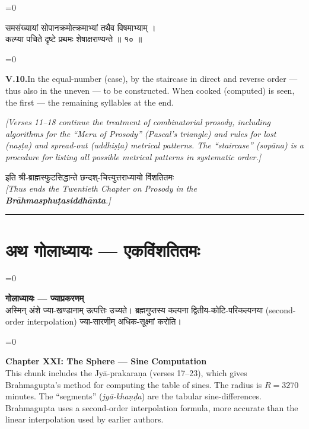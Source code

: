 \documentclass[11pt,a4paper]{article}
\newcommand{\longline}{\noindent\rule{\textwidth}{0.4pt}}
\newcommand{\cnote}[1]{\textcolor{notecolor}{\textit{#1}}}
\newcommand{\dev}[1]{{\devanagarifont\color{sktcolor}#1}}
\newcommand{\dsec}[1]{\section*{\dev{#1}}}
\newcommand{\iast}[1]{\textit{#1}}
\newenvironment{paracol}[1]{\begingroup}{\endgroup}
\newcommand{\switchcolumn}[1][]{%
  \ifnum#1=0\relax\else\par\nobreak\vspace{0.5em}\par\nobreak\fi%
}
\begin{document}
\vspace{0.3cm}

\begin{paracol}{2}
\switchcolumn[0]
\dev{%
समसंख्यायां सोपानक्रमोत्क्रमाभ्यां तथैव विषमाभ्याम् ।\\
कल्प्या पचिते दृष्टे प्रथमः शेषाक्षराण्यन्ते ॥ १० ॥
}

\switchcolumn[1]
\textbf{V.10.}\quad In the equal-number (case), by the staircase
in direct and reverse order — thus also in the uneven — to be
constructed. When cooked (computed) is seen, the first — the
remaining syllables at the end.
\end{paracol}

\vspace{0.5cm}
\cnote{[Verses 11–18 continue the treatment of combinatorial prosody,
including algorithms for the ``Meru of Prosody'' (Pascal's triangle)
and rules for lost (\iast{naṣṭa}) and spread-out (\iast{uddhiṣṭa})
metrical patterns. The ``staircase'' (\iast{sopāna}) is a procedure
for listing all possible metrical patterns in systematic order.]}

\vspace{0.5cm}

\begin{center}
\dev{इति श्री-ब्राह्मस्फुटसिद्धान्ते छन्दश्-चित्त्युत्तराध्यायो विंशतितमः}\\[0.3cm]
\textit{[Thus ends the Twentieth Chapter on Prosody in the
\textbf{Brāhmasphuṭasiddhānta}.]}
\end{center}

\longline
\newpage

\dsec{अथ गोलाध्यायः — एकविंशतितमः}

\begin{paracol}{2}
\switchcolumn[0]
\dev{%
\textbf{गोलाध्यायः — ज्याप्रकरणम्}\\[0.2cm]
अस्मिन् अंशे ज्या-खण्डानाम् उत्पत्तिः उच्यते। ब्रह्मगुप्तस्य
कल्पना द्वितीय-कोटि-परिकल्पनया (second-order interpolation)
ज्या-सारणीम् अधिक-सूक्ष्मां करोति।
}

\switchcolumn[1]
\textbf{Chapter XXI: The Sphere — Sine Computation}\\[0.2cm]
This chunk includes the Jyā-prakaraṇa (verses 17–23), which gives
Brahmagupta's method for computing the table of sines. The radius
is $R = 3270$ minutes. The ``segments'' (\iast{jyā-khaṇḍa}) are
the tabular sine-differences. Brahmagupta uses a second-order
interpolation formula, more accurate than the linear interpolation
used by earlier authors.
\end{paracol}
\end{document}
